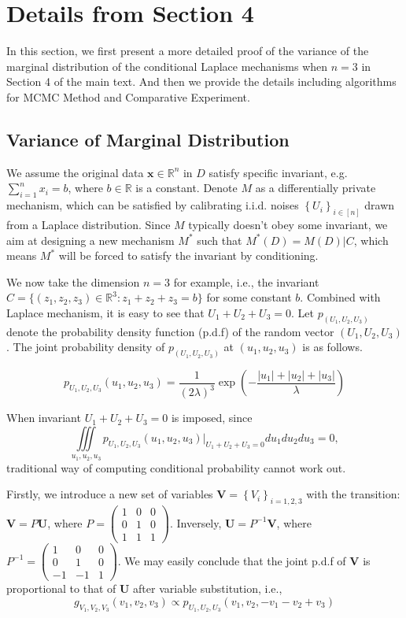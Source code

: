 \documentclass[11pt]{article}
\begin{document}
\section{Details from Section 4}

In this section, we first present a more detailed proof of the variance of the marginal distribution of the conditional Laplace mechanisms when $n=3$ in Section 4 of the main text.  And then we provide the details including algorithms for MCMC Method and Comparative Experiment. 

\subsection{Variance of Marginal Distribution}

We assume the original data $\boldsymbol{x}\in \mathbb{R}^{n}$ in $D$ satisfy specific invariant, e.g. $\sum_{i=1}^{n} x_{i}=b$, where $b \in \mathbb{R}$ is a constant. Denote $M$ as a differentially private mechanism, which can be satisfied by calibrating i.i.d. noises $\left\{U_{i}\right\}_{i \in[n]}$ drawn from a Laplace distribution. Since $M$ typically doesn't obey some invariant, we aim at designing a new mechanism $M^{\ast}$ such that $M^{\ast}(D)=M(D)|C$, which means  $M^{\ast}$ will be forced to satisfy the invariant by conditioning.

We now take the dimension $n=3$ for example, i.e., the invariant $C=\{(z_1,z_2,z_3)\in \mathbb{R}^3: z_1+ z_2 + z_3=b\}$ for some constant $b$. Combined with Laplace mechanism, it is easy to see that $U_1+U_2+U_3=0$. Let $p_{(U_1, U_2, U_3)}$ denote the probability density function (p.d.f) of the random vector $(U_1, U_2, U_3)$.
The joint probability density of $p_{(U_1, U_2, U_3)}$ at $(u_1,u_2,u_3)$ is as follows.

$$
p_{U_1,U_2,U_3}(u_1,u_2,u_3)= \frac{1}{(2 \lambda)^{3}} \exp \left(-\frac{|u_1|+|u_2|+|u_3|}{\lambda}\right)
$$

When invariant $U_1+U_2+U_3=0$ is imposed, since $$\underset{u_1,u_2,u_3}{\iiint} p_{U_1,U_2,U_3}(u_1,u_2,u_3)|_{U_1+U_2+U_3=0} d u_1d u_2d u_3=0,$$ traditional way of computing conditional probability cannot work out.

Firstly, we introduce a new set of variables $\boldsymbol{V}=\left\{V_{i}\right\}_{i=1,2,3}$ with the transition:
$\boldsymbol{V}=P\boldsymbol{U}$, where
$
P=\begin{pmatrix}  
  1 & 0 & 0 \\  
  0 & 1 & 0 \\  
  1 & 1 & 1  
\end{pmatrix} 
$. Inversely, $\boldsymbol{U}=P^{-1}\boldsymbol{V}$, where
$
P^{-1}=\begin{pmatrix}  
  1 & 0 & 0 \\  
  0 & 1 & 0 \\  
  -1 & -1 & 1  
\end{pmatrix} $. We may easily conclude that the joint p.d.f of $\boldsymbol{V}$ is proportional to that of $\boldsymbol{U}$ after variable substitution, i.e., $$g_{V_1,V_2,V_3}(v_1,v_2,v_3) \propto p_{U_1,U_2,U_3}(v_1,v_2,-v_1-v_2+v_3)$$
\end{document}
